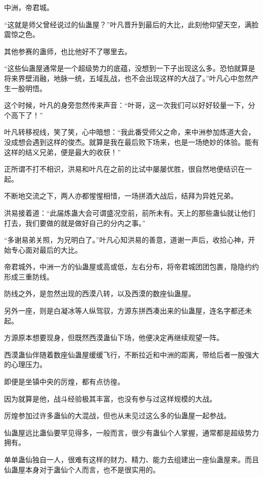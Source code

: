 
\begin{this_body}

中洲，帝君城。

“这就是师父曾经说过的仙蛊屋？”叶凡晋升到最后的大比，此刻他仰望天空，满脸震惊之色。

其他参赛的蛊师，也比他好不了哪里去。

“这些仙蛊屋通常是一个超级势力的底蕴，没想到一下子出现这么多。恐怕就算是将来界壁消融，地脉一统，五域乱战，也不会出现这样的大战了。”叶凡心中忽然产生一股明悟。

这个时候，叶凡的身旁忽然传来声音：“叶哥，这一次我们可以好好较量一下，分个高下了！”

叶凡转移视线，笑了笑，心中暗想：“我此番受师父之命，来中洲参加炼道大会，没成想会遇到这样的俊杰。就算是我在最后败下场来，也是一场绝妙的体验。能有这样的结义兄弟，便是最大的收获！”

正所谓不打不相识，洪易和叶凡在之前的比试中屡屡优胜，很自然地便结识在一起。

不断地交流之下，两人亦都惺惺相惜，一场拼酒大战后，结拜为异姓兄弟。

洪易接着道：“此届炼蛊大会可谓盛况空前，前所未有。天上的那些蛊仙就让他们打去，我们要做的就是做好自己的分内之事。”

“多谢易弟关照，为兄明白了。”叶凡心知洪易的善意，道谢一声后，收拾心神，开始专心面对最后的大比。

帝君城外，中洲一方的仙蛊屋或高或低，左右分布，将帝君城团团包裹，隐隐约约形成三重防线。

防线之外，是忽然出现的西漠八转，以及西漠的数座仙蛊屋。

另外一座，则是白凝冰等人纵驾驭，方源东拼西凑出来的仙蛊屋，连名字都还未起。

方源原本想要现身，但既然西漠蛊仙下场，他便决定再继续观望一阵。

西漠蛊仙伴随着数座仙蛊屋缓缓飞行，不断拉近和中洲的距离，带给后者一股强大的心理压力。

即便是坐镇中央的厉煌，都有点彷徨。

因为就算是他，战斗经验极其丰富，也没有参与过这样规模的大战。

厉煌参加过许多蛊仙的大混战，但也从未见过这么多的仙蛊屋一起参战。

仙蛊屋远比蛊仙要罕见得多，一般而言，很少有蛊仙个人掌握，通常都是超级势力拥有。

单单蛊仙独自一人，很难有这样的财力、精力、能力去组建出一座仙蛊屋来。而且仙蛊屋本身对于蛊仙个人而言，也不是很实用的。


\end{this_body}
